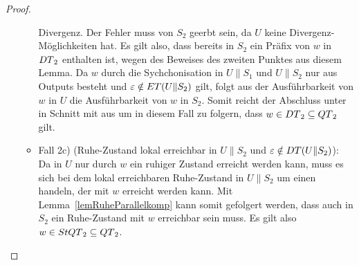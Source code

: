 \begin{proof}
\begin{itemize}
\begin{itemize}
          Divergenz. Der Fehler muss von $S_2$ geerbt sein, da $U$ keine
          Divergenz-Möglichkeiten hat. Es gilt also, dass bereits in $S_2$ ein
          Präfix von $w$ in $DT{}_2$ enthalten ist, wegen des Beweises des
          zweiten Punktes aus diesem Lemma. Da $w$ durch die Sychchonisation in
          $U\|S_1$ und $U\|S_2$ nur aus Outputs besteht und $\varepsilon\notin
          ET{}(U\|S_2)$ gilt, folgt aus der Ausführbarkeit von $w$ in $U$ die
          Ausführbarkeit von $w$ in $S_2$. Somit reicht der Abschluss unter
          \cont{} in Schnitt mit \EL{} aus um in diesem Fall zu folgern, dass
          $w\in DT{}_2\subseteq QT{}_2$ gilt.
        \item Fall 2c) (Ruhe-Zustand lokal erreichbar in $U\|S_2$ und
          $\varepsilon\notin DT{}(U\|S_2)$): Da in $U$ nur durch $w$ ein
          ruhiger Zustand erreicht werden kann, muss es sich bei dem lokal
          erreichbaren Ruhe-Zustand in $U\|S_2$ um einen handeln, der mit $w$
          erreicht werden kann. Mit Lemma~\ref{lemRuheParallelkomp} kann somit
          gefolgert werden, dass auch in $S_2$ ein Ruhe-Zustand mit $w$
          erreichbar sein muss. Es gilt also $w\in StQT{}_2\subseteq QT{}_2$.
      \end{itemize}
  \end{itemize}
\end{proof}




